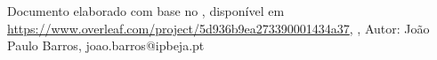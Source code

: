 \documentclass[PT,alphabetic]{ipbeja-format}
\begin{document}
\setcounter{page}{1}
\folhacapa %
\folharosto %
\frontmatter %

\clearpage

\clearpage


\clearpage


\clearpage
\indicegeral  
\clearpage
\indicedefiguras %
\clearpage
\indicedetabelas %
\clearpage
\indicedelistagens %

% 

\mainmatter  \pagestyle{ruled} %





\clearpage
\printbibliography[heading=bibintoc]
\apendices

\anexos



\vfill
{\footnotesize Documento elaborado com base no , disponível em \url{https://www.overleaf.com/project/5d936b9ea273390001434a37}, \version, Autor: João Paulo Barros, joao.barros@ipbeja.pt}
\end{document}
